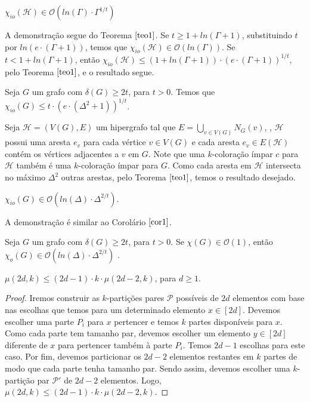 \documentclass[12pt]{article}
\begin{document}
{\begin{cor} 
	\label{cor1}  
	$\chi_{io}(\mathcal{H}) \in \mathcal{O}(ln(\Gamma) {\cdot} \Gamma^{1/t})$
\end{cor}

	A demonstração segue do Teorema $\ref{teo1}$. Se $t \geq 1 + ln (\Gamma + 1)$, substituindo $t$ por $ln(e {\cdot} (\Gamma + 1))$, temos que $\chi_{io}(\mathcal{H}) \in \mathcal{O}(ln(\Gamma))$. Se $t < 1 + ln (\Gamma + 1)$, então $\chi_{io}(\mathcal{H}) \leq (1 + ln (\Gamma + 1)) {\cdot} (e {\cdot} (\Gamma + 1))^{1/t}$, pelo Teorema $\ref{teo1}$, e o resultado segue. \newbegin
	
\begin{cor}
	\label{cor2}  
	Seja $G$ um grafo com $\delta(G) \geq 2t$, para $t > 0$. Temos que $\chi_{io}(G) \leq t {\cdot} (e {\cdot} (\Delta^2 + 1))^{1/t}$.
\end{cor}
	 
	  Seja $\mathcal{H} = (V(G), E)$ um hipergrafo tal que $E = \bigcup\limits_{v \in V(G)}N_G(v)$, \ie, $\mathcal{H}$ possui uma aresta $e_v$ para cada vértice $v \in V(G)$ e cada aresta $e_v \in E(\mathcal{H})$ contém os vértices adjacentes a $v$ em $G$. Note que uma $k$-coloração  ímpar $c$ para $\mathcal{H}$ também é uma $k$-coloração ímpar para $G$. Como cada aresta em $\mathcal{H}$ intersecta no máximo $\Delta^2$ outras arestas, pelo Teorema $\ref{teo1}$, temos o resultado desejado. \newbegin

\begin{cor}
	\label{cor3}  
	 $\chi_{io}(G) \in \mathcal{O}(ln(\Delta) {\cdot} \Delta^{2/t})$.
\end{cor}
     
     A demonstração é similar ao Corolário $\ref{cor1}$.
\newbegin

\begin{teo}
	\label{teo2}  
	Seja $G$ um grafo com $\delta(G) \geq 2t$, para $t > 0$. Se $\chi(G) \in \mathcal{O}(1)$, então $\chi_{o}(G) \in \mathcal{O}(ln(\Delta) {\cdot} \Delta^{2/t})$ .
\end{teo}

 \newpage
 
 \begin{lema}  
 	\label{lema1} 
 	$\mu(2d, k) \leq (2d - 1) \cdot k \cdot \mu(2d - 2, k)$, para $d \geq 1$.
 \end{lema}
 
 \begin{proof} Iremos construir as $k$-partições pares $\mathcal{P}$ possíveis de $2d$ elementos com base nas escolhas que temos para um determinado elemento $x \in [2d]$. Devemos escolher uma parte $P_i$ para $x$ pertencer e temos $k$ partes disponíveis para $x$. Como cada parte tem tamanho par, devemos escolher um elemento $y \in [2d]$ diferente de $x$ para pertencer também à parte $P_i$. Temos $2d - 1$ escolhas para este caso. Por fim, devemos particionar os $2d - 2$ elementos restantes em $k$ partes de modo que cada parte tenha tamanho par. Sendo assim, devemos escolher uma $k$-partição par $\mathcal{P'}$ de $2d - 2$ elementos. Logo, $\mu(2d, k) \leq (2d - 1) \cdot k \cdot \mu(2d - 2, k)$. 
 	

\end{proof}}
\end{document}
